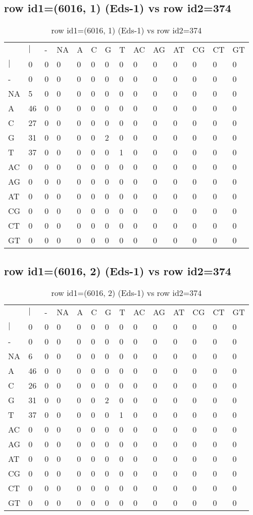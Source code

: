 \subsection{row id1=(6016, 1) (Eds-1) vs row id2=374}
\begin{center}
\begin{longtable}{|l|l|l|l|l|l|l|l|l|l|l|l|l|l|}
\caption{row id1=(6016, 1) (Eds-1) vs row id2=374} \label{table_dm12}\\
\hline
\\
\hline
&$|$&-&NA&A&C&G&T&AC&AG&AT&CG&CT&GT\\
$|$&0&0&0&0&0&0&0&0&0&0&0&0&0\\
-&0&0&0&0&0&0&0&0&0&0&0&0&0\\
NA&5&0&0&0&0&0&0&0&0&0&0&0&0\\
A&46&0&0&0&0&0&0&0&0&0&0&0&0\\
C&27&0&0&0&0&0&0&0&0&0&0&0&0\\
G&31&0&0&0&0&2&0&0&0&0&0&0&0\\
T&37&0&0&0&0&0&1&0&0&0&0&0&0\\
AC&0&0&0&0&0&0&0&0&0&0&0&0&0\\
AG&0&0&0&0&0&0&0&0&0&0&0&0&0\\
AT&0&0&0&0&0&0&0&0&0&0&0&0&0\\
CG&0&0&0&0&0&0&0&0&0&0&0&0&0\\
CT&0&0&0&0&0&0&0&0&0&0&0&0&0\\
GT&0&0&0&0&0&0&0&0&0&0&0&0&0\\
\hline
\end{longtable}
\end{center}

\subsection{row id1=(6016, 2) (Eds-1) vs row id2=374}
\begin{center}
\begin{longtable}{|l|l|l|l|l|l|l|l|l|l|l|l|l|l|}
\caption{row id1=(6016, 2) (Eds-1) vs row id2=374} \label{table_dm14}\\
\hline
\\
\hline
&$|$&-&NA&A&C&G&T&AC&AG&AT&CG&CT&GT\\
$|$&0&0&0&0&0&0&0&0&0&0&0&0&0\\
-&0&0&0&0&0&0&0&0&0&0&0&0&0\\
NA&6&0&0&0&0&0&0&0&0&0&0&0&0\\
A&46&0&0&0&0&0&0&0&0&0&0&0&0\\
C&26&0&0&0&0&0&0&0&0&0&0&0&0\\
G&31&0&0&0&0&2&0&0&0&0&0&0&0\\
T&37&0&0&0&0&0&1&0&0&0&0&0&0\\
AC&0&0&0&0&0&0&0&0&0&0&0&0&0\\
AG&0&0&0&0&0&0&0&0&0&0&0&0&0\\
AT&0&0&0&0&0&0&0&0&0&0&0&0&0\\
CG&0&0&0&0&0&0&0&0&0&0&0&0&0\\
CT&0&0&0&0&0&0&0&0&0&0&0&0&0\\
GT&0&0&0&0&0&0&0&0&0&0&0&0&0\\
\hline
\end{longtable}
\end{center}

